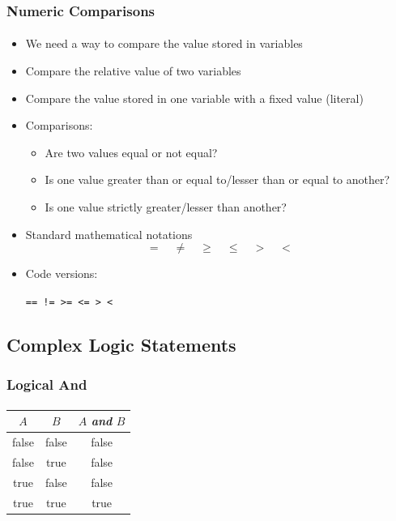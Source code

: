 \documentclass[]{beamer}
\begin{document}
\begin{frame}[fragile]
  \frametitle{Numeric Comparisons}
  \framesubtitle{}

\begin{itemize}[<+->]
  \item We need a way to compare the value stored in variables
  \item Compare the relative value of two variables
  \item Compare the value stored in one variable with a fixed value (literal)
  \item Comparisons:
  \begin{itemize}
    \item Are two values equal or not equal?
    \item Is one value greater than or equal to/lesser than or equal to another?
    \item Is one value strictly greater/lesser than another?
  \end{itemize}
  \item Standard mathematical notations
  	$$= \quad \neq \quad \geq \quad \leq \quad  > \quad <$$
  \item Code versions:
  \begin{center}
  	\texttt{==   !=   >=   <=   >   <}
  \end{center}
\end{itemize}

\end{frame}

\subsection{Complex Logic Statements}

\begin{frame}[fragile]
    \frametitle{Logical And}
    \framesubtitle{}
    
    \begin{center}
    \begin{tabular}{c|c|c}
    $A$ & $B$ & $A$ \emph{and} $B$ \\
    \hline\hline
    false & false & false\\
    false & true & false\\
    true & false & false\\
    true & true & true\\
    \end{tabular}
    \end{center}

\end{frame}
\end{document}
